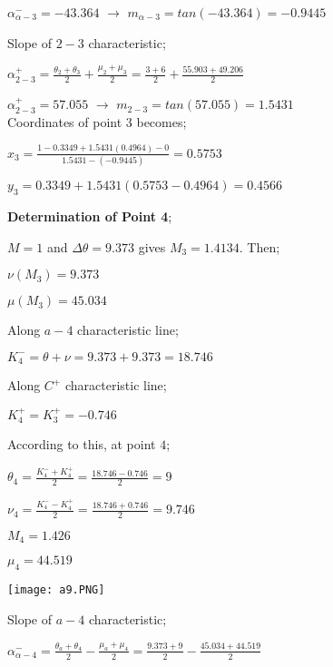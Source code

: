 \begin{appendices}
${\alpha}_{\alpha-3}^{-} = -43.364 $ $\rightarrow$   $m_{\alpha-3} = tan(-43.364) = -0.9445$

Slope of $2-3$ characteristic;

${\alpha}^{+}_{2-3} = \frac{\theta_2+\theta_3}{2}+\frac{\mu_2+\mu_3}{2} = \frac{3+6}{2}+\frac{55.903+49.206}{2}$

${\alpha}_{2-3}^{+} = 57.055 $  $\rightarrow$  $m_{2-3} = tan(57.055) = 1.5431$\\

Coordinates of point $3$ becomes;\\

{\color{magenta}
	$x_3 = \frac{1-0.3349+1.5431(0.4964)-0}{1.5431-(-0.9445)} = 0.5753 $
	
	$y_3 = 0.3349+1.5431(0.5753-0.4964)=0.4566$
}

\pagebreak

\noindent\textbf{Determination of Point 4};\\

\begin{minipage}{0.65\textwidth}
	
	$M=1$ and $\Delta\theta = 9.373$ gives $M_3=1.4134$. Then;
	
	$\nu(M_3)=9.373$
	
	$\mu(M_3)=45.034$
	
	Along $a-4$ characteristic line;
	
	$K_4^- = \theta + \nu = 9.373 + 9.373 = 18.746$
	
	Along $C^+$ characteristic line;
	
	$K_4^+ = K_3^+ = -0.746$
	
	According to this, at point $4$;
	
	$\theta_4 = \frac{K_4^-+K_4^+}{2} = \frac{18.746-0.746}{2} = 9$
	
	$\nu_4 = \frac{K_4^--K_4^+}{2} = \frac{18.746+0.746}{2} = 9.746$
	
	$M_4 = 1.426$
	
	$\mu_4 = 44.519$\\
	
\end{minipage}
\begin{minipage}{0.35\textwidth}
	\texttt{[image: a9.PNG]}
\end{minipage}%
\noindent

Slope of $a-4$ characteristic;

${\alpha}^{-}_{\alpha-4} = \frac{\theta_a+\theta_4}{2}-\frac{\mu_a+\mu_4}{2} = \frac{9.373+9}{2}-\frac{45.034+44.519}{2}$


\end{appendices}
